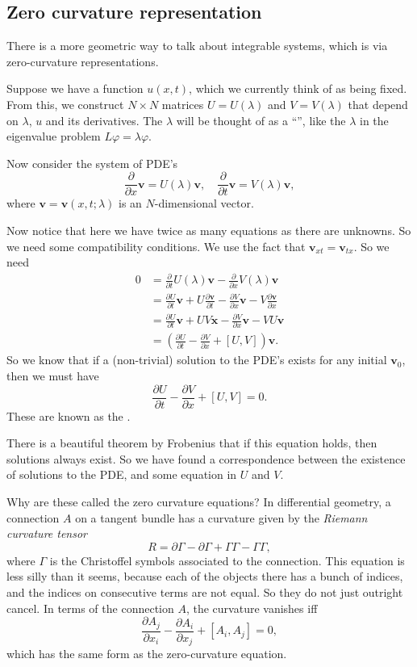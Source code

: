 \documentclass[a4paper]{article}
\begin{document}
\subsection{Zero curvature representation}
There is a more geometric way to talk about integrable systems, which is via zero-curvature representations.

Suppose we have a function $u(x, t)$, which we currently think of as being fixed. From this, we construct $N \times N$ matrices $U = U(\lambda)$ and $V = V(\lambda)$ that depend on $\lambda$, $u$ and its derivatives. The $\lambda$ will be thought of as a ``'', like the $\lambda$ in the eigenvalue problem $L \varphi = \lambda \varphi$.

Now consider the system of PDE's
\[
  \frac{\partial}{\partial x}\mathbf{v} = U(\lambda) \mathbf{v},\quad \frac{\partial}{\partial t} \mathbf{v} = V(\lambda) \mathbf{v},\tag{$\dagger$}
\]
where $\mathbf{v} = \mathbf{v}(x, t; \lambda)$ is an $N$-dimensional vector.

Now notice that here we have twice as many equations as there are unknowns. So we need some compatibility conditions. We use the fact that $\mathbf{v}_{xt} = \mathbf{v}_{tx}$. So we need
\begin{align*}
  0 &= \frac{\partial}{\partial t} U(\lambda) \mathbf{v} - \frac{\partial}{\partial x}V(\lambda) \mathbf{v}\\
  &= \frac{\partial U}{\partial t} \mathbf{v} + U \frac{\partial \mathbf{v}}{\partial t} - \frac{\partial V}{\partial x}\mathbf{v} - V \frac{\partial \mathbf{v}}{\partial x}\\
  &= \frac{\partial U}{\partial t}\mathbf{v} + UV \mathbf{x} - \frac{\partial V}{\partial x}\mathbf{v} - VU \mathbf{v}\\
  &= \left(\frac{\partial U}{\partial t} - \frac{\partial V}{\partial x} + [U, V]\right) \mathbf{v}.
\end{align*}
So we know that if a (non-trivial) solution to the PDE's exists for any initial $\mathbf{v}_0$, then we must have
\[
  \frac{\partial U}{\partial t} - \frac{\partial V}{\partial x} + [U, V] = 0.
\]
These are known as the .

There is a beautiful theorem by Frobenius that if this equation holds, then solutions always exist. So we have found a correspondence between the existence of solutions to the PDE, and some equation in $U$ and $V$.

Why are these called the zero curvature equations? In differential geometry, a connection $A$ on a tangent bundle has a curvature given by the \emph{Riemann curvature tensor}
\[
  R = \partial \Gamma - \partial \Gamma + \Gamma \Gamma - \Gamma \Gamma,
\]
where $\Gamma$ is the Christoffel symbols associated to the connection. This equation is less silly than it seems, because each of the objects there has a bunch of indices, and the indices on consecutive terms are not equal. So they do not just outright cancel. In terms of the connection $A$, the curvature vanishes iff
\[
  \frac{\partial A_j}{\partial x_i} - \frac{\partial A_i}{\partial x_j} + [A_i, A_j] = 0,
\]
which has the same form as the zero-curvature equation.
\end{document}
